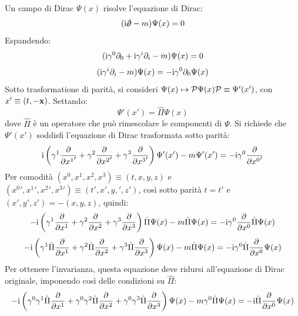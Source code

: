 Un campo di Dirac $ \Psi(x) $ risolve l'equazione di Dirac:
\begin{equation}
  (\img \slashed{\pa} - m) \Psi(x) = 0
\end{equation}
Espandendo:
\begin{equation*}
  (\mathrm{i} \gamma^0 \partial_0 + \mathrm{i} \gamma^i \partial_i - m) \Psi(x) = 0
\end{equation*}
\begin{equation*}
  (\mathrm{i} \gamma^i \partial_i - m) \Psi(x) = - \mathrm{i} \gamma^0 \partial_0 \Psi(x)
\end{equation*}
Sotto trasformatione di parità, si consideri $ \Psi(x) \mapsto \mathcal{P} \Psi(x) \mathcal{P} \equiv \Psi'(x') $, con $ x'  \equiv (t , -\mathbf{x}) $. Settando:
\begin{equation*}
  \Psi'(x') = \hat{\Pi} \Psi(x)
\end{equation*}
dove $ \hat{\Pi} $ è un operatore che può rimescolare le componenti di $ \Psi $. Si richiede che $ \Psi'(x') $ soddisfi l'equazione di Dirac trasformata sotto parità:
\begin{equation*}
  \mathrm{i} \left( \gamma^1 \frac{\partial}{\partial {x^1}'} + \gamma^2 \frac{\partial}{\partial {x^2}'} + \gamma^3 \frac{\partial}{\partial {x^3}'} \right) \Psi'(x') - m \Psi'(x') = - \mathrm{i} \gamma^0 \frac{\partial}{\partial {x^0}'}
\end{equation*}
Per comodità $ (x^0,x^1,x^2,x^3) \equiv (t,x,y,z) $ e $ ({x^0}' , {x^1}' , {x^2}' , {x^3}') \equiv (t',x',y,',z') $, così sotto parità $ t = t' $ e $ (x',y',z') = - (x,y,z) $, quindi:
\begin{equation*}
  - \mathrm{i} \left( \gamma^1 \frac{\partial}{\partial x^1} + \gamma^2 \frac{\partial}{\partial x^2} + \gamma^3 \frac{\partial}{\partial x^3} \right) \hat{\Pi} \Psi(x) - m \hat{\Pi} \Psi(x) = - \mathrm{i} \gamma^0 \frac{\partial}{\partial x^0} \hat{\Pi} \Psi(x)
\end{equation*}
\begin{equation*}
  - \mathrm{i} \left( \gamma^1 \hat{\Pi} \frac{\partial}{\partial x^1} + \gamma^2 \hat{\Pi} \frac{\partial}{\partial x^2} + \gamma^3 \hat{\Pi} \frac{\partial}{\partial x^3} \right) \Psi(x) - m \hat{\Pi} \Psi(x) = - \mathrm{i} \gamma^0 \hat{\Pi} \frac{\partial}{\partial x^0} \Psi(x)
\end{equation*}
Per ottenere l'invarianza, questa equazione deve ridursi all'equazione di Dirac originale, imponendo così delle condizioni su $ \hat{\Pi} $:
\begin{equation*}
  - \mathrm{i} \left( \gamma^0 \gamma^1 \hat{\Pi} \frac{\partial}{\partial x^1} + \gamma^0 \gamma^2 \hat{\Pi} \frac{\partial}{\partial x^2} + \gamma^0 \gamma^3 \hat{\Pi} \frac{\partial}{\partial x^3} \right) \Psi(x) - m \gamma^0 \hat{\Pi} \Psi(x) = - \mathrm{i} \hat{\Pi} \frac{\partial}{\partial x^0} \Psi(x)
\end{equation*}
